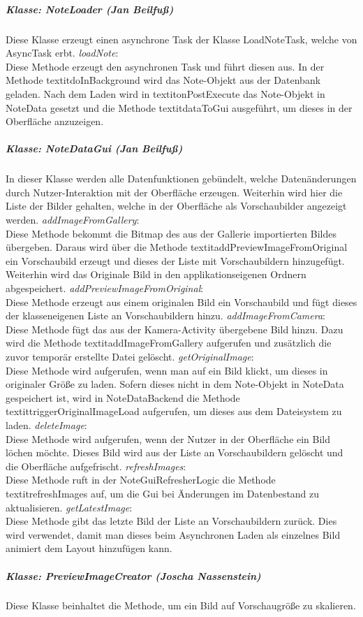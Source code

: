 \subparagraph{Klasse: NoteLoader (Jan Beilfuß)}
Diese Klasse erzeugt einen asynchrone Task der Klasse LoadNoteTask, welche von AsyncTask erbt.
\textit{loadNote}:\\
Diese Methode erzeugt den asynchronen Task und führt diesen aus. In der Methode textit{doInBackground} wird das Note-Objekt aus der Datenbank geladen. Nach dem Laden wird in textit{onPostExecute} das Note-Objekt in NoteData gesetzt und die Methode textit{dataToGui} ausgeführt, um dieses in der Oberfläche anzuzeigen.
\subparagraph{Klasse: NoteDataGui (Jan Beilfuß)}
In dieser Klasse werden alle Datenfunktionen gebündelt, welche Datenänderungen durch Nutzer-Interaktion mit der Oberfläche erzeugen. Weiterhin wird hier die Liste der Bilder gehalten, welche in der Oberfläche als Vorschaubilder angezeigt werden.
\textit{addImageFromGallery}:\\
Diese Methode bekommt die Bitmap des aus der Gallerie importierten Bildes übergeben. Daraus wird über die Methode textit{addPreviewImageFromOriginal} ein Vorschaubild erzeugt und dieses der Liste mit Vorschaubildern hinzugefügt. Weiterhin wird das Originale Bild in den applikationseigenen Ordnern abgespeichert.
\textit{addPreviewImageFromOriginal}:\\
Diese Methode erzeugt aus einem originalen Bild ein Vorschaubild und fügt dieses der klasseneigenen Liste an Vorschaubildern hinzu.
\textit{addImageFromCamera}:\\
Diese Methode fügt das aus der Kamera-Activity übergebene Bild hinzu. Dazu wird die Methode textit{addImageFromGallery} aufgerufen und zusätzlich die zuvor temporär erstellte Datei gelöscht.
\textit{getOriginalImage}:\\
Diese Methode wird aufgerufen, wenn man auf ein Bild klickt, um dieses in originaler Größe zu laden. Sofern dieses nicht in dem Note-Objekt in NoteData gespeichert ist, wird in NoteDataBackend die Methode textit{triggerOriginalImageLoad} aufgerufen, um dieses aus dem Dateisystem zu laden.
\textit{deleteImage}:\\
Diese Methode wird aufgerufen, wenn der Nutzer in der Oberfläche ein Bild löchen möchte. Dieses Bild wird aus der Liste an Vorschaubildern gelöscht und die Oberfläche aufgefrischt.
\textit{refreshImages}:\\
Diese Methode ruft in der NoteGuiRefresherLogic die Methode textit{refreshImages} auf, um die Gui bei Änderungen im Datenbestand zu aktualisieren.
\textit{getLatestImage}:\\
Diese Methode gibt das letzte Bild der Liste an Vorschaubildern zurück. Dies wird verwendet, damit man dieses beim Asynchronen Laden als einzelnes Bild animiert dem Layout hinzufügen kann.
\subparagraph{Klasse: PreviewImageCreator (Joscha Nassenstein)}
Diese Klasse beinhaltet die Methode, um ein Bild auf Vorschaugröße zu skalieren.

